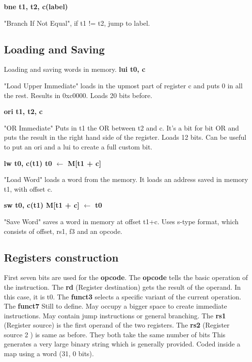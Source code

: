 \documentclass{article}
\begin{document}
    \textbf{bne t1, t2, c(label)}
    \par "Branch If Not Equal", if t1 != t2, jump to label. 

    \subsection{Loading and Saving}
    \par Loading and saving words in memory.\medbreak
    \textbf{lui t0, c}
    \par "Load Upper Immediate" loads in the upmost part of register c and
    puts 0 in all the rest. Results in 0xc0000. Loads 20 bits before.\medbreak

    \textbf{ori t1, t2, c}
    \par "OR Immediate" Puts in t1 the OR between t2 and c. It's a
    bit for bit OR and puts the result in the right hand side of the register.
    Loads 12 bits. Can be useful to put an ori and a lui to create a full custom
    bit. \medbreak

    \textbf{lw t0, c(t1) \qquad t0 $\leftarrow$ M[t1 + c]}
    \par "Load Word" loads a word from the memory. It loads an address saved in 
    memory t1, with offset c. \medbreak 

    \textbf{sw t0, c(t1) \qquad M[t1 + c] $\leftarrow$ t0 }
    \par "Save Word" saves a word in memory at offset t1+c. Uses s-type format,
    which consists of offset, rs1, f3 and an opcode.

    \subsection{Registers construction}
    First seven bits are used for the \textbf{opcode}.\newline
    The \textbf{opcode} tells the basic operation of the instruction.\newline
    The \textbf{rd} (Register destination) gets the result of the operand. 
        In this case, it is t0.\newline
    The \textbf{funct3} selects a specific variant of the current operation.\newline
    The \textbf{funct7} Still to define. May occupy a bigger space to create immediate
    instructions. May contain jump instructions or general branching. \newline
    The \textbf{rs1} (Register source) is the first operand of the two registers.\newline
    The \textbf{rs2} (Register source 2 ) is same as before. They both take the same
        number of bits\newline
    This generates a very large binary string which is generally provided.
    Coded inside a map using a word (31, 0 bits).
\end{document}
